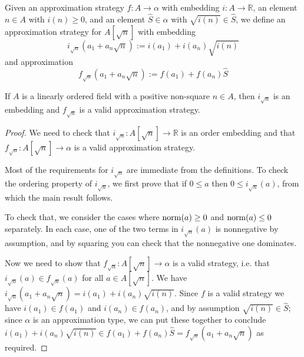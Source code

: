 \begin{definition}
  \label{def:adjoinApprox}
  \leanok
  Given an approximation strategy $f : A → α$ with embedding $i : A → ℝ$, an
  element $n ∈ A$ with $i(n) \geq 0$, and an element $\hat{S} ∈ α$ with
  $\sqrt{i(n)} ∈ \hat{S}$, we define an approximation strategy for
  $A[\sqrt{n}]$ with embedding
  $$i_{\sqrt{n}}(a_1 + a_n\sqrt{n}) := i(a_1) + i(a_n)\sqrt{i(n)}$$ and
  approximation $$f_{\sqrt{n}}(a_1 + a_n\sqrt{n}) := f(a_1) + f(a_n)\hat{S}$$
\end{definition}

\begin{lemma}
  \label{thm:adjoinApproxValid}
  \leanok
  If $A$ is a linearly ordered field with a positive non-square $n ∈ A$, then
  $i_{\sqrt{n}}$ is an embedding and $f_{\sqrt{n}}$ is a valid
  approximation strategy.
\end{lemma}

\begin{proof}
  \leanok
  We need to check that $i_{\sqrt{n}} : A[\sqrt{n}] → ℝ$ is an order embedding
  and that $f_{\sqrt{n}} : A[\sqrt{n}] → α$ is a valid approximation strategy.

  Most of the requirements for $i_{\sqrt{n}}$ are immediate from the definitions. To check
  the ordering property of $i_{\sqrt{n}}$, we first prove that if $0 \leq a$ then $0 \leq
  i_{\sqrt{n}}(a)$, from which the main result follows.

  To check that, we consider the cases where $\operatorname{norm}(a) \geq 0$ and $\operatorname{norm}(a)
  \leq 0$ separately. In each case, one of the two terms in $i_{\sqrt{n}}(a)$
  is nonnegative by assumption, and by squaring you can check that the nonnegative
  one dominates.

  Now we need to show that $f_{\sqrt{n}} : A[\sqrt{n}] → α$ is a valid strategy, i.e.
  that $i_{\sqrt{n}}(a) ∈ f_{\sqrt{n}}(a)$ for all $a ∈ A[\sqrt{n}]$. We have
  $i_{\sqrt{n}}(a_1 + a_n\sqrt{n}) = i(a_1) + i(a_n)\sqrt{i(n)}$. Since $f$ is a valid
  strategy we have $i(a_1) ∈ f(a_1)$ and $i(a_n) ∈ f(a_n)$, and by assumption
  $\sqrt{i(n)} ∈ \hat{S}$; since $α$ is an approximation type, we can put these
  together to conclude $i(a_1) + i(a_n)\sqrt{i(n)} ∈ f(a_1) + f(a_n)\hat{S} =
  f_{\sqrt{n}}(a_1 + a_n\sqrt{n})$ as required.
\end{proof}

